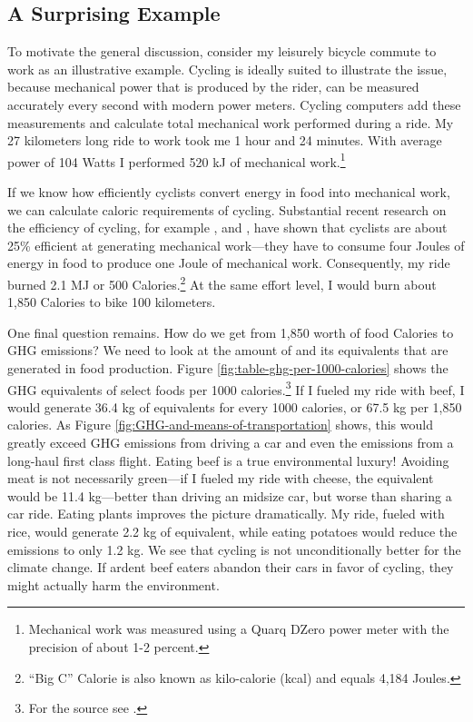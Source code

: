 \documentclass{article}[12pt,letterpaper]
\begin{document}
\subsection{A Surprising Example}
To motivate the general discussion, consider my leisurely bicycle commute to work as an illustrative example. Cycling is ideally suited to illustrate the issue, because mechanical power that is produced by the rider, can be measured accurately every second with modern power meters. Cycling computers add these measurements and calculate total mechanical work performed during a ride. My 27 kilometers long ride to work took me 1 hour and 24 minutes. With average power of 104 Watts I performed 520 kJ of mechanical work.\footnote{Mechanical work was measured using a Quarq DZero power meter with the precision of about 1-2 percent.}

If we know how efficiently cyclists convert energy in food into mechanical work, we can calculate caloric requirements of cycling. Substantial recent research on the efficiency of cycling, for example \citet{delta-cyc-1}, \citet{cycling-efficiency-review} and \citet{efficiency-young-old}, have shown that cyclists are about 25\% efficient at generating mechanical work---they have to consume four Joules of energy in food to produce one Joule of mechanical work. Consequently, my ride burned 2.1 MJ or 500 Calories.\footnote{``Big C'' Calorie is also known as kilo-calorie (kcal) and equals 4,184 Joules.} At the same effort level, I would burn about 1,850 Calories to bike 100 kilometers.

One final question remains. How do we get from 1,850 worth of food Calories to GHG emissions? We need to look at the amount of \cadi and its equivalents that are generated in food production. Figure \ref{fig:table-ghg-per-1000-calories} shows the GHG equivalents of select foods per 1000 calories.\footnote{For the source see \citet{carbon-footprint-food-methane}.}
If I fueled my ride with beef, I would generate 36.4 kg of \cadi equivalents for every 1000 calories, or 67.5 kg per 1,850 calories. As Figure \ref{fig:GHG-and-means-of-transportation} shows, this would greatly exceed GHG emissions from driving a car and even the emissions from a long-haul first class flight. Eating beef is a true environmental luxury! Avoiding meat is not necessarily green---if I fueled my ride with cheese, the \cadi equivalent would be 11.4 kg---better than driving an midsize car, but worse than sharing a car ride. Eating plants improves the picture dramatically. My ride, fueled with rice, would generate 2.2 kg of \cadi equivalent, while eating potatoes would reduce the emissions to only 1.2 kg. We see that cycling is not unconditionally better for the climate change. If ardent beef eaters abandon their cars in favor of cycling, they might actually harm the environment.
\end{document}
